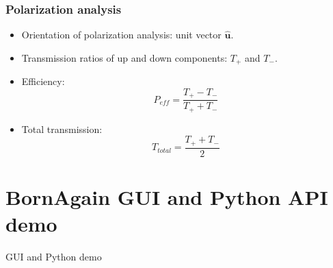 \documentclass{beamer}
\begin{document}
\begin{frame}
    \frametitle{Polarization analysis}
    \begin{itemize}
        \item Orientation of polarization analysis: unit vector $\mathbf{\hat u}$.
        \item Transmission ratios of up and down components: $T_+$ and $T_-$.
        \item Efficiency:
              \[ P_{eff} = \frac{T_+ - T_-}{T_+ + T_-} \]
        \item Total transmission:
              \[ T_{total} = \frac{T_+ + T_-}{2} \]
    \end{itemize}
\end{frame}

\section{BornAgain GUI and Python API demo}

\begin{frame}
    \begin{center}
        \LARGE{GUI and Python demo}
    \end{center}
\end{frame}
\end{document}
